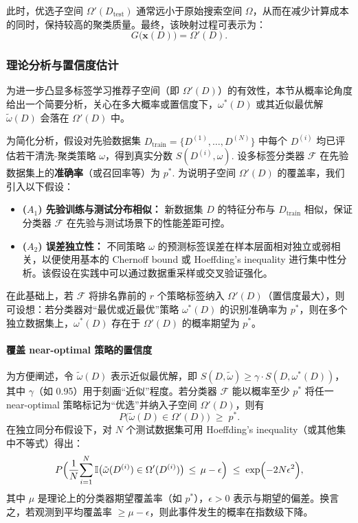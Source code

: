 \documentclass[10pt]{article} %
\numberwithin{equation}{section}
\begin{document}
此时，优选子空间 $\Omega'(D_{\text{test}})$ 通常远小于原始搜索空间 $\Omega$，从而在减少计算成本的同时，保持较高的聚类质量。最终，该映射过程可表示为：
\begin{equation}\label{eq:mapping-function}
G\bigl(\mathbf{x}(D)\bigr) = \Omega'(D).
\end{equation}

\subsubsection{理论分析与置信度估计}\label{subsec:theoretical_analysis}

为进一步凸显多标签学习推荐子空间（即 $\Omega'(D)$）的有效性，本节从概率论角度给出一个简要分析，关心在多大概率或置信度下，$\omega^*(D)$ 或其近似最优解 $\tilde{\omega}(D)$ 会落在 $\Omega'(D)$ 中。

为简化分析，假设对先验数据集 $D_{\text{train}}=\{D^{(1)},\ldots,D^{(N)}\}$ 中每个 $D^{(i)}$ 均已评估若干清洗-聚类策略 $\omega$，得到真实分数 $S(D^{(i)},\omega)$. 设多标签分类器 $\mathcal{F}$ 在先验数据集上的\textbf{准确率}（或召回率等）为 $p^*$.  
为说明子空间 $\Omega'(D)$ 的覆盖率，我们引入以下假设：
\begin{itemize}[leftmargin=1.5em]
    \item \textbf{($A_1$) 先验训练与测试分布相似：} 新数据集 $D$ 的特征分布与 $D_{\text{train}}$ 相似，保证分类器 $\mathcal{F}$ 在先验与测试场景下的性能差距可控。
    \item \textbf{($A_2$) 误差独立性：} 不同策略 $\omega$ 的预测标签误差在样本层面相对独立或弱相关，以便使用基本的 Chernoff bound 或 Hoeffding’s inequality 进行集中性分析。该假设在实践中可以通过数据重采样或交叉验证强化。
\end{itemize}

在此基础上，若 $\mathcal{F}$ 将排名靠前的 $r$ 个策略标签纳入 $\Omega'(D)$（置信度最大），则可设想：若分类器对“最优或近最优”策略 $\omega^*(D)$ 的识别准确率为 $p^*$，则在多个独立数据集上，$\omega^*(D)$ 存在于 $\Omega'(D)$ 的概率期望为 $p^*$。

\paragraph{覆盖 near-optimal 策略的置信度}
为方便阐述，令 $\tilde{\omega}(D)$ 表示近似最优解，即 $S(D,\tilde{\omega}) \ge \gamma \cdot S(D,\omega^*(D))$，其中 $\gamma$（如 0.95）用于刻画“近似”程度。若分类器 $\mathcal{F}$ 能以概率至少 $p^*$ 将任一 near-optimal 策略标记为“优选”并纳入子空间 $\Omega'(D)$，则有
\[
P\bigl(\tilde{\omega}(D)\in \Omega'(D)\bigr) \;\ge\; p^*.
\]
在独立同分布假设下，对 $N$ 个测试数据集可用 Hoeffding's inequality（或其他集中不等式）得出：
\[
P\Bigl(\frac{1}{N}\!\sum_{i=1}^N \mathbb{I}\bigl(\tilde{\omega}(D^{(i)})\in \Omega'(D^{(i)})\bigr) \,\le\, \mu - \epsilon \Bigr) 
\;\le\; \exp\Bigl(-2N\epsilon^2\Bigr),
\]
其中 $\mu$ 是理论上的分类器期望覆盖率（如 $p^*$），$\epsilon>0$ 表示与期望的偏差。换言之，若观测到平均覆盖率 $\ge \mu - \epsilon$，则此事件发生的概率在指数级下降。
\end{document}
